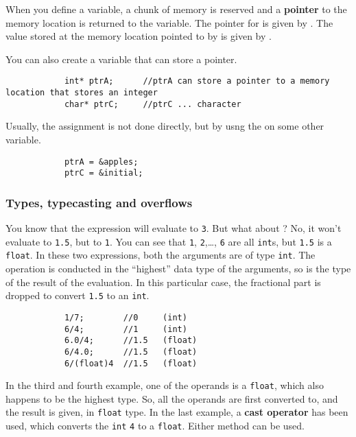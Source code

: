 \documentclass{article}
\begin{document}

			When you define a variable, a chunk of memory is reserved and a \textbf{pointer} to the memory location is returned to the variable. The pointer for  is given by . The value stored at the memory location pointed to by  is given by .

			You can also create a variable that can store a pointer.

			\begin{lstlisting}
			int* ptrA;		//ptrA can store a pointer to a memory location that stores an integer
			char* ptrC;		//ptrC ... character
			\end{lstlisting}

			Usually, the assignment is not done directly, but by usng the \inlncd{\&} on some other variable.

			\begin{lstlisting}
			ptrA = &apples;
			ptrC = &initial;
			\end{lstlisting}

		\subsubsection{Types, typecasting and overflows}

			You know that the expression  will evaluate to \texttt{3}. But what about ? No, it won't evaluate to \texttt{1.5}, but to \texttt{1}. You can see that \texttt{1}, \texttt{2},\ldots, \texttt{6} are all \texttt{int}s, but \texttt{1.5} is a \texttt{float}. In these two expressions, both the arguments are of type \texttt{int}. The operation is conducted in the ``highest'' data type of the arguments, so is the type of the result of the evaluation. In this particular case, the fractional part is dropped to convert \texttt{1.5} to an \texttt{int}.

			\begin{lstlisting}
			1/7;		//0		(int)
			6/4;		//1		(int)
			6.0/4;		//1.5	(float)
			6/4.0;		//1.5	(float)
			6/(float)4	//1.5	(float)
			\end{lstlisting}

			In the third and fourth example, one of the operands is a \texttt{float}, which also happens to be the highest type. So, all the operands are first converted to, and the result is given, in \texttt{float} type. In the last example, a \textbf{cast operator} has been used, which converts the \texttt{int} \texttt{4} to a \texttt{float}. Either method can be used.
\end{document}
